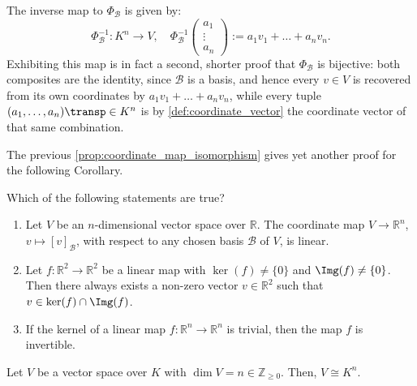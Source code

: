 \begin{remark}
The inverse map to $\Phi_{\mathcal{B}}$ is given by:
\[
\Phi_{\mathcal{B}}^{-1}: K^n \to V, \quad \Phi_{\mathcal{B}}^{-1}
\begin{pmatrix}
a_1 \\
\vdots \\
a_n
\end{pmatrix}
:= a_1 v_1 + \dots + a_n v_n.
\]
Exhibiting this map is in fact a second, shorter proof that $\Phi_{\mathcal{B}}$ is bijective: both composites are the identity, since $\mathcal{B}$ is a basis, and hence every $v \in V$ is recovered from its own coordinates by $a_1 v_1 + \dots + a_n v_n$, while every tuple $(a_1, \dots, a_n)\transp \in K^n$ is by \cref{def:coordinate_vector} the coordinate vector of that same combination.
\end{remark}

\begin{remark}
The previous \cref{prop:coordinate_map_isomorphism} gives yet another proof for the following Corollary.
\end{remark}

\begin{exercise}
\label{exc:properties_coordinate_maps_mc}
Which of the following statements are true?
\begin{enumerate}
    \item Let $V$ be an $n$-dimensional vector space over $\mathbb{R}$. The coordinate map $V \to \mathbb{R}^n$, $v \mapsto [v]_{\mathcal{B}}$, with respect to any chosen basis $\mathcal{B}$ of $V$, is linear.
    \item Let $f \colon \mathbb{R}^2 \to \mathbb{R}^2$ be a linear map with $\ker(f) \ne \{0\}$ and $\Img(f) \ne \{0\}$. Then there always exists a non-zero vector $v \in \mathbb{R}^2$ such that $v \in \ker(f) \cap \Img(f)$.
    \item If the kernel of a linear map $f \colon \mathbb{R}^n \to \mathbb{R}^n$ is trivial, then the map $f$ is invertible.
\end{enumerate}
\end{exercise}

\begin{corollary}
\label{cor:vs_isomorphic_to_kn}
Let $V$ be a vector space over $K$ with $\dim V = n \in \mathbb{Z}_{\ge 0}$. Then, $V \cong K^n$.
\end{corollary}


